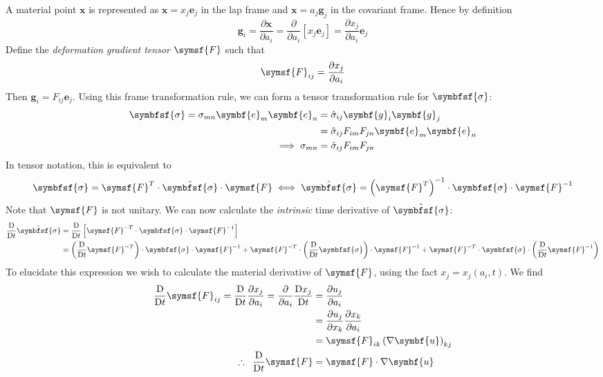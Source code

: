 \documentclass{jknotes}
\begin{document}
A material point $\symbf{x}$ is represented as $\symbf{x} = x_j \symbf{e}_j$
in the lap frame and $\symbf{x} = a_j \symbf{g}_j$ in the covariant frame.
Hence by definition
\begin{equation}
	\symbf{g}_i = \frac{\partial \symbf{x}}{\partial a_i} =
	\frac{\partial}{\partial a_i} \left[ x_j \symbf{e}_j\right] =
	\frac{\partial x_j}{\partial a_i} \symbf{e}_j
\end{equation}
Define the \emph{deformation gradient tensor} $\symsf{F}$ such that
\begin{equation}
	\symsf{F}_{ij} = \frac{\partial x_j}{\partial a_i}
\end{equation}
Then $\symbf{g}_i = F_{ij} \symbf{e}_j$. Using this frame transformation rule,
we can form a tensor transformation rule for $\symbfsf{\sigma}$:
\begin{align}
	\symbfsf{\sigma} = \sigma_{mn} \symbf{e}_m \symbf{e}_n &= \hat{\sigma}_{ij}
	\symbf{g}_i \symbf{g}_j  \\
	&= \hat{\sigma}_{ij} F_{im} F_{jn} \symbf{e}_m \symbf{e}_n \\
	\implies \sigma_{mn} &= \hat{\sigma}_{ij} F_{im} F_{jn}
\end{align}
In tensor notation, this is equivalent to
\begin{equation}
	\symbfsf{\sigma} = \symsf{F}^T \cdot \hat{\symbfsf{\sigma}} \cdot
	\symsf{F} \iff \hat{\symbfsf{\sigma}} = \left( \symsf{F}^T\right)^{-1}
	\cdot \symbfsf{\sigma} \cdot \symsf{F}^{-1}
\end{equation}
Note that $\symsf{F}$ is not unitary. We can now calculate the
\emph{intrinsic} time derivative of $\hat{\symbfsf{\sigma}}$:
\begin{align}
	\frac{\diffD}{\diffD t} \hat{\symbfsf{\sigma}} &= \frac{\diffD}{\diffD t}
	\left[ \symsf{F}^{-T} \cdot \symbfsf{\sigma} \cdot \symsf{F}^{-1}\right]
	\\
	&= \left( \frac{\diffD}{\diffD t} \symsf{F}^{-T}\right) \cdot
	\symbfsf{\sigma} \cdot \symsf{F}^{-1} + \symsf{F}^{-T} \cdot \left(
	\frac{\diffD}{\diffD t} \symbfsf{\sigma}\right) \cdot \symsf{F}^{-1} +
	\symsf{F}^{-T} \cdot \symbfsf{\sigma}  \cdot \left( \frac{\diffD}{\diffD
	t} \symsf{F}^{-1}\right)
\end{align}
To elucidate this expression we wish to calculate the material derivative of
$\symsf{F}$, using the fact $x_j = x_j(a_i,t)$. We find
\begin{align}
	\frac{\diffD}{\diffD t} \symsf{F}_{ij} = \frac{\diffD}{\diffD t}
	\frac{\partial x_j}{\partial a_i} = \frac{\partial}{\partial a_i}
	\frac{\diffD x_j}{\diffD t} &= \frac{\partial u_j}{\partial a_i} \\
						&=
	\frac{\partial u_j}{\partial x_k} \frac{\partial x_k}{\partial a_i} \\
	&= \symsf{F}_{ik} \left(\nabla \symbf{u}\right)_{kj}\\
	\therefore\,\,\, \frac{\diffD}{\diffD t} \symsf{F} &= \symsf{F} \cdot \nabla
	\symbf{u}
\end{align}
\end{document}
